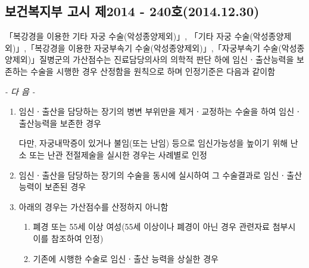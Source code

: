 \subsection{보건복지부 고시 제2014 - 240호(2014.12.30)}
「복강경을 이용한 기타 자궁 수술(악성종양제외)」, 「기타 자궁 수술(악성종양제외)」,「복강경을 이용한 자궁부속기 수술(악성종양제외)」,「자궁부속기 수술(악성종양제외)」질병군의 가산점수는 진료담당의사의 의학적 판단 하에 임신ㆍ출산능력을 보존하는 수술을 시행한 경우 산정함을 원칙으로 하며 인정기준은 다음과 같이함\par
\begin{center}\emph{- 다 음 -}\end{center}
\begin{enumerate}[가.]\tightlist
\item 임신ㆍ출산을 담당하는 장기의 병변 부위만을 제거ㆍ교정하는 수술을 하여 임신ㆍ출산능력을 보존한 경우\par
다만, 자궁내막증이 있거나 불임(또는 난임) 등으로 임신가능성을 높이기 위해 난소 또는 난관 전절제술을 실시한 경우는 사례별로 인정
\item 임신ㆍ출산을 담당하는 장기의 수술을 동시에 실시하여 그 수술결과로 임신ㆍ출산능력이 보존된 경우
\item 아래의 경우는 가산점수를 산정하지 아니함
	\begin{enumerate}[(1)]\tightlist
	\item 폐경 또는 55세 이상 여성(55세 이상이나 폐경이 아닌 경우 관련자료 첨부시 이를 참조하여 인정)
	\item 기존에 시행한 수술로 임신ㆍ출산 능력을 상실한 경우
	\end{enumerate}
\end{enumerate}